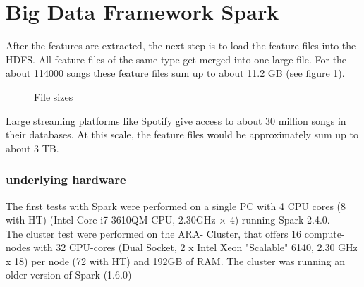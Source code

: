 
\section{Big Data Framework Spark}\label{bds1}

After the features are extracted, the next step is to load the feature files into the HDFS.
All feature files of the same type get merged into one large file. For the about 114000 songs these feature files sum up to about 11.2 GB (see figure \ref{filesize}). 

\begin{figure}[htbp]
	\centering
	\caption{File sizes}
	\label{filesize}
\end{figure}

\noindent Large streaming platforms like Spotify give access to about 30 million songs in their databases. At this scale, the feature files would be approximately sum up to about 3 TB.\\

\subsubsection{underlying hardware}

The first tests with Spark were performed on a single PC with 4 CPU cores (8 with HT) (Intel Core i7-3610QM CPU, 2.30GHz × 4) running Spark 2.4.0.\\ The cluster test were performed on the ARA- Cluster, that offers 16 compute-nodes with 32 CPU-cores (Dual Socket, 2 x Intel Xeon "Scalable" 6140, 2.30 GHz x 18) per node (72 with HT) and 192GB of RAM. The cluster was running an older version of Spark (1.6.0)\\

